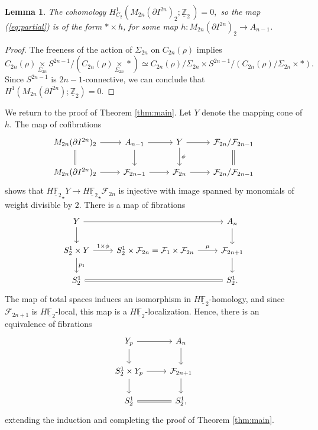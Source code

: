 \documentclass[]{amsart}  %
\newtheorem{lemma}[equation]{Lemma}
\theoremstyle{definition}
\numberwithin{equation}{section}
\numberwithin{figure}{section}
\newcommand{\mF}{{\mathbb F}}
\newcommand{\mZ}{{\mathbb Z}}
\newcommand{\cF}{{\mathcal F}}
\newcommand{\umF}{\underline{\mF}}
\newcommand{\umZ}{\underline{\mZ}}
\newcommand{\0}{\langle 0 \rangle}
\begin{document}
	\begin{lemma}
	   The cohomology $H^1_{C_2} (M_{2n}(\partial I^{2n})_2; {\umZ_2} \,) = 0,$ so the map (\ref{eq:partial}) is of the form $* \times h$, for some map $h: M_{2n}(\partial I^{2n})_{2} \rightarrow A_{n-1}$.  
	\end{lemma}
	\begin{proof}
            The freeness of the action of $\Sigma_{2n}$ on $C_{2n}(\rho)$ implies
 \[C_{2n}(\rho) \underset{\Sigma_{2n}}{\times} S^{2n-1} / (C_{2n} (\rho) \underset{\Sigma_{2n}}{\times} *) \simeq C_{2n} (\rho)/ \Sigma_{2n} \times S^{2n-1}/(C_{2n} (\rho) / \Sigma_{2n} \times *) .\] Since $S^{2n-1}$ is $2n-1$-connective, we can conclude that $H^{1}(M_{2n}(\partial I^{2n}); \umZ_2) = 0$.
\end{proof}

 We return to the proof of Theorem \ref{thm:main}. Let $Y$ denote the mapping cone of $h.$ The map of cofibrations
	\[
	\begin{tikzcd}
		M_{2n} (\partial I^{2n})_2 \arrow[r]{h} \arrow[d, equal] & A_{n - 1} \arrow[r] \arrow[d] & Y \arrow[r] \arrow[d, "\phi"] & \cF_{2n} / \cF_{2n - 1} \arrow[d, equal] \\
		M_{2n}(\partial I^{2n})_2 \arrow[r] & \cF_{2n - 1} \arrow[r] & \cF_{2n} \arrow[r] & \cF_{2n} / \cF_{2n - 1}
	\end{tikzcd}
	\]
	shows that $H {\umF_2}_\star Y \to H {\umF_2}_\star \cF_{2n}$ is injective with image spanned by monomials of weight divisible by $2.$ There is a map of fibrations 
	\[
	\begin{tikzcd}
		Y \arrow[rr] \arrow[d] & & A_n \arrow[d] \\
		S_2^1 \times Y \arrow[r, "1 \times \phi"] \arrow[d, "p_1"] & S_2^1 \times \cF_{2n}= \cF_1 \times \cF_{2n} \arrow[r, "\mu"] & \cF_{2n + 1} \arrow[d] \\
		S_2^1 \arrow[rr, equal] & & S_2^1.
	\end{tikzcd}
	\]
	The map of total spaces induces an isomorphism in $H \umF_2$-homology, and since $\cF_{2n + 1}$ is $H \umF_2$-local, this map is a $H \umF_2$-localization. Hence, there is an equivalence of fibrations 
	\[
	\begin{tikzcd}
		Y_p \arrow[r] \arrow[d] & A_n \arrow[d] \\
		S_2^1 \times Y_p \arrow[r]{} \arrow[d]{} & \cF_{2n + 1} \arrow[d] \\
		S_2^1 \arrow[r, equal] & S_2^1, 
	\end{tikzcd}
	\]
	extending the induction and completing the proof of Theorem \ref{thm:main}.
\end{document}
